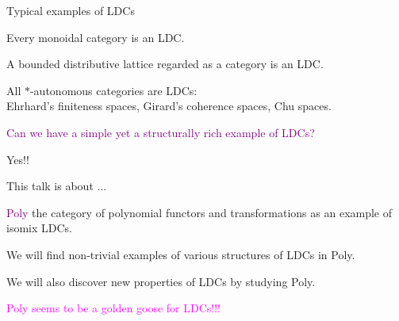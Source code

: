 \documentclass[aspectratio=169]{beamer}
\begin{document}
\begin{frame}{Typical examples of LDCs}

\vspace{2em}

Every monoidal category is an LDC.

\vspace{0.75em}

A bounded distributive lattice regarded as a category is an LDC.

\vspace{0.75em}

All $*$-autonomous categories are LDCs: \\
Ehrhard’s finiteness spaces, Girard's coherence spaces, Chu spaces.

\vspace{1.5em}

\begin{center} 

\textcolor{purple}{\Large Can we have a simple yet a structurally rich example of LDCs?}

\vspace{0.5em}

{\Large Yes!!}

\end{center}

\end{frame}


\begin{frame}{This talk is about ... }

\vspace{1em}

\textcolor{purple}{Poly} the category of polynomial functors and transformations as an example of isomix LDCs.

\vspace{1em}

We will find non-trivial examples of various {structures of LDCs} in Poly.

\vspace{1em}

We will also {discover new properties} of LDCs by studying Poly.

\vspace{2em}

\begin{center} \textcolor{magenta}{Poly seems to be a golden goose for LDCs!!!} \end{center}
   
\end{frame}
\end{document}

